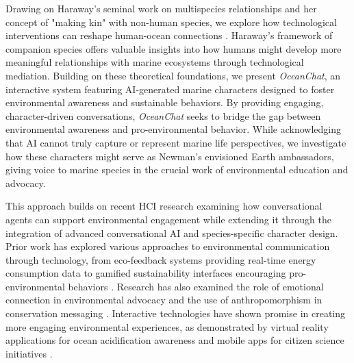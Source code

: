\documentclass[sigconf, nonacm]{acmart}
\begin{document}
Drawing on Haraway's seminal work on multispecies relationships and her concept of "making kin" with non-human species, we explore how technological interventions can reshape human-ocean connections  \cite{Haraway2016}. Haraway's framework of companion species offers valuable insights into how humans might develop more meaningful relationships with marine ecosystems through technological mediation. Building on these theoretical foundations, we present \textit{OceanChat}, an interactive system featuring AI-generated marine characters designed to foster environmental awareness and sustainable behaviors. By providing engaging, character-driven conversations, \textit{OceanChat} seeks to bridge the gap between environmental awareness and pro-environmental behavior. While acknowledging that AI cannot truly capture or represent marine life perspectives, we investigate how these characters might serve as Newman's envisioned Earth ambassadors, giving voice to marine species in the crucial work of environmental education and advocacy.

This approach builds on recent HCI research examining how conversational agents can support environmental engagement \cite{Giudici2024, Hillebrand2021, Breiter2024} while extending it through the integration of advanced conversational AI and species-specific character design. Prior work has explored various approaches to environmental communication through technology, from eco-feedback systems providing real-time energy consumption data to gamified sustainability interfaces encouraging pro-environmental behaviors \cite{Strengers2011, Hillebrand2021}. Research has also examined the role of emotional connection in environmental advocacy and the use of anthropomorphism in conservation messaging \cite{Nabi2018, RootBernstein2013}. Interactive technologies have shown promise in creating more engaging environmental experiences, as demonstrated by virtual reality applications for ocean acidification awareness and mobile apps for citizen science initiatives \cite{Fauville2021, Johnson2020}.
\end{document}
